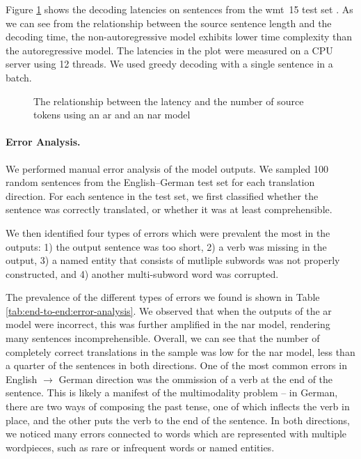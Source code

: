 Figure \ref{fig:end-to-end:speed} shows the decoding latencies on sentences
from the \ac{wmt}~15 test set \citep{bojar-etal-2015-findings}. As we can see
from the relationship between the source sentence length and the decoding time,
the non-autoregressive model exhibits lower time complexity than the
autoregressive model. The latencies in the plot were measured on a CPU server
using 12 threads. We used greedy decoding with a single sentence in a batch.

\begin{figure}
  \centering
  

  \caption{The relationship between the latency and the number of source tokens
    using an \acs{ar} and an \acs{nar} model}%
  \label{fig:end-to-end:speed}
\end{figure}


\paragraph{Error Analysis.}
We performed manual error analysis of the model outputs. We sampled 100 random
sentences from the English--German test set for each translation direction.
For each sentence in the test set, we first classified whether the sentence was
correctly translated, or whether it was at least comprehensible.

We then identified four types of errors which were prevalent the most in the
outputs: 1) the output sentence was too short, 2) a verb was missing in the
output, 3) a named entity that consists of mutliple subwords was not properly
constructed, and 4) another multi-subword word was corrupted.

The prevalence of the different types of errors we found is shown in Table
\ref{tab:end-to-end:error-analysis}. We observed that when the outputs of the
\ac{ar} model were incorrect, this was further amplified in the \ac{nar} model,
rendering many sentences incomprehensible. Overall, we can see that the number
of completely correct translations in the sample was low for the \ac{nar}
model, less than a quarter of the sentences in both directions. One of the most
common errors in English $\rightarrow$ German direction was the ommission of a
verb at the end of the sentence. This is likely a manifest of the multimodality
problem -- in German, there are two ways of composing the past tense, one of
which inflects the verb in place, and the other puts the verb to the end of the
sentence. In both directions, we noticed many errors connected to words which
are represented with multiple wordpieces, such as rare or infrequent words or
named entities.

